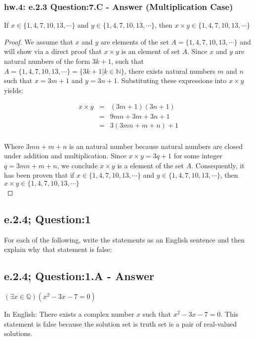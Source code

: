 \newpage
\subsubsection*{hw.4: e.2.3 Question:7.C - Answer (Multiplication Case)}
\begin{tcolorbox}
\begin{theorem}
If $x \in \{1, 4, 7, 10, 13, \cdots \}$ and $y \in \{1, 4, 7, 10, 13, \cdots \}$, then $x \times y \in \{1, 4, 7, 10, 13, \cdots \}$
\end{theorem}
\end{tcolorbox}

\begin{proof}
We assume that $x$ and $y$ are elements of the set $A = \{1, 4, 7, 10, 13, \cdots \}$ and will show via a direct proof that $x \times y$ is an element of set $A$. Since $x$ and $y$ are natural numbers of the form $3k + 1$, such that $A = \{1, 4, 7, 10, 13, \cdots \} = \{ 3k + 1 | k \in \mathbb{N} \}$, there exists natural numbers $m$ and $n$ such that $x = 3m + 1$ and $y = 3n + 1$. Substituting these expressions into $x \times y$ yields:

\begin{eqnarray*}
x \times y & = & (3m + 1)(3n + 1) \nonumber \\
& = & 9mn + 3m + 3n + 1 \nonumber \\
& = & 3(3mn + m + n) + 1 \nonumber \\
\end{eqnarray*}

Where $3mn + m + n$ is an natural number because natural numbers are closed under addition and multiplication. Since $x \times y = 3q + 1$ for some integer $q = 3mn + m + n$, we conclude $x \times y$ is a element of the set $A$. Consequently, it has been proven that if $x \in \{1, 4, 7, 10, 13, \cdots \}$ and $y \in \{1, 4, 7, 10, 13, \cdots \}$, then $x \times y \in \{1, 4, 7, 10, 13, \cdots \}$ \\
\end{proof}


\subsection{e.2.4; Question:1}
For each of the following, write the statements as an English sentence and then explain why that statement is false: 

\subsection{e.2.4; Question:1.A - Answer}
	\begin{center}
		$(\exists x \in \mathbb{Q})(x^2 -3x - 7 = 0)$
	\end{center}
In English: There exists a complex number $x$ such that $x^2 -3x - 7 = 0$. This statement is false because the solution set is truth set is a pair of real-valued solutions. 

